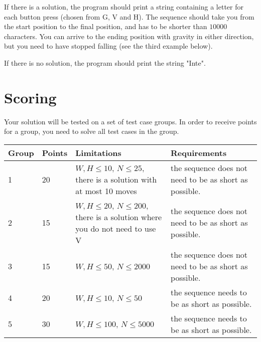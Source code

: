 If there is a solution, the program should print a string containing a letter for each button press (chosen from G, V and H). The sequence should take you from the start position to the final position, and has to be shorter than $10000$ characters. You can arrive to the ending position with gravity in either direction, but you need to have stopped falling (see the third example below).

If there is no solution, the program should print the string "Inte".

\section*{Scoring}
Your solution will be tested on a set of test case groups. In order to receive points for a group, you need to solve all test cases in the group.

\begin{tabular}{| l | l | l | l |}
	\hline
	Group & Points & Limitations & Requirements \\ \hline
  1     & 20  & $W,H \le 10$, $N \le 25$, there is a solution with at most 10 moves & the sequence does not need to be as short as possible. \\ \hline
  2     & 15  & $W,H \le 20$, $N \le 200$, there is a solution where you do not need to use V & the sequence does not need to be as short as possible. \\ \hline
  3     & 15  & $W,H \le 50$, $N \le 2000$ & the sequence does not need to be as short as possible. \\ \hline
  4     & 20  & $W,H \le 10$, $N \le 50$ & the sequence needs to be as short as possible. \\ \hline
  5     & 30  & $W,H \le 100$, $N \le 5000$ & the sequence needs to be as short as possible. \\ \hline
\end{tabular}
